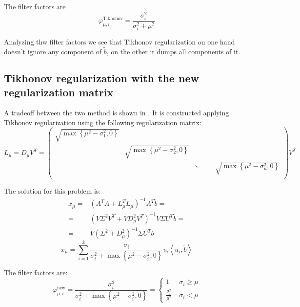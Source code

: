 \documentclass[a4paper,10pt]{article}
\theoremstyle{plain}
\theoremstyle{definition}
\theoremstyle{remark}
\newcommand{\set}[1]{\left\{#1\right\}}
\newcommand{\pa}[1]{\left(#1\right)}
\newcommand{\ang}[1]{\left<#1\right>}
\begin{document}
The filter factors are
\begin{equation}
  \label{eq:tikfilter}
  \varphi ^{\text{Tikhonov}} _{\mu,i} = \frac{\sigma _i ^2}{\sigma _i
    ^2 + \mu ^2}
\end{equation}

Analyzing thw filter factors we see that Tikhonov regularization on
one hand doesn't ignore any component of $\tilde b$, on the other it
dumps all components of it.

\subsection{Tikhonov regularization with the new regularization matrix}

A tradeoff between the two method is shown in \cite{modtikh}. It is
constructed applying Tikhonov regularization using the following
regularization matrix:
\begin{equation*}
  \label{eq:modtikL}
  L_\mu = D _\mu V^T =
  \begin{pmatrix}
    \sqrt{\max\set{\mu ^2 - \sigma _1 ^2,0}} \\
    & \sqrt{\max\set{\mu ^2 - \sigma _2 ^2,0}} \\
    & & \ddots
    & & & \sqrt{\max\set{\mu ^2 - \sigma _n ^2,0}} \\
  \end{pmatrix}
  V^T
\end{equation*}

The solution for this problem is:
\begin{align*}
  x_\mu =& \pa{ A^T A + L_\mu^T L_\mu }^{-1} A^T \tilde b = \\
  = & \pa{ V \Sigma ^2 V^T + V D_\mu ^2 V^T} ^{-1} V\Sigma U^T \tilde
  b = \\
  = & V \pa{ \Sigma ^2 + D_\mu ^2 } ^{-1} \Sigma U^T \tilde b
\end{align*}
\begin{equation}
  \label{eq:modtikx}
  x_\mu  = \sum _{i=1} ^k \frac{\sigma _i}{\sigma _i ^2 + \max\set{
      \mu ^2 - \sigma _i ^2 ,0}  }  v_i \ang{u_i,\tilde b}
\end{equation}

The filter factors are:
\begin{equation}
  \label{eq:modtikfilter}
  \varphi ^{\text{new}} _{\mu,i} = \frac{\sigma _i ^2}{\sigma _i ^2 + \max\set{
      \mu ^2 - \sigma _i ^2 ,0}  } = \left\{
  \begin{matrix}
    1\; & \sigma _i \ge \mu \\
    \frac{\sigma _i ^2}{\mu ^2} \; & \sigma _i < \mu
  \end{matrix}
  \right.
\end{equation}
\end{document}
